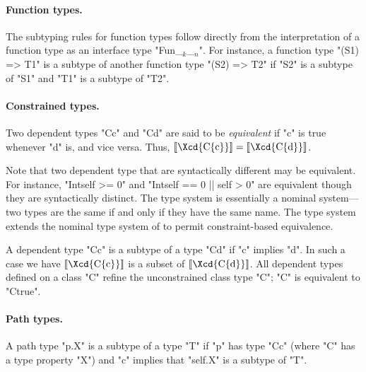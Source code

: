 \paragraph{Function types.}

The subtyping rules for function types follow directly from the
interpretation of a function type as an interface type
\xcdmath"Fun_$_k$_$_n$".
For instance,
a function type
\xcd"(S1) => T1" 
is a subtype of another function type
\xcd"(S2) => T2" 
if \xcd"S2" is a subtype of \xcd"S1"
and \xcd"T1" is a subtype of \xcd"T2".

\paragraph{Constrained types.}

Two dependent types \xcd"C{c}" and \xcd"C{d}" are said to be {\em equivalent} if 
\xcd"c" is true whenever \xcd"d" is, and vice versa. Thus, 
$\LL{\mbox{\Xcd{C\{c\}}}} = \LL{\mbox{\Xcd{C\{d\}}}}$.

Note that two dependent type that are syntactically different may be
equivalent. For instance, \xcd"Int{self >= 0}" and
\xcd"Int{self == 0 || self > 0}" are equivalent though they are syntactically
distinct. The \Java{} type system is essentially a nominal system---two
types are the same if and only if they have the same name. The \Xten{}
type system extends the nominal type system of \Java{} to permit
constraint-based equivalence.

A dependent type \xcd"C{c}" is a subtype of a type \xcd"C{d}" if
\xcd"c" implies \xcd"d".  In such a case we have
$\LL{\mbox{\Xcd{C\{c\}}}}$ is a
subset of $\LL{\mbox{\Xcd{C\{d\}}}}$. All dependent types
defined on a class \xcd"C"
refine the unconstrained class type \xcd"C"; \xcd"C" is
equivalent to \xcd"C{true}".

\paragraph{Path types.}

A path type \xcd"p.X" is a subtype of a type \xcd"T" if
\xcd"p" has type \xcd"C{c}" (where \xcd"C" has a type property
\xcd"X") and \xcd"c" implies that \xcd"self.X" is a subtype of \xcd"T".




